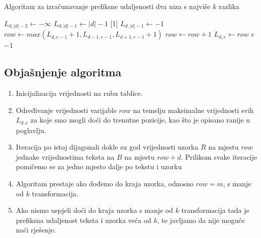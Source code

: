 \documentclass[times, utf8, zavrsni]{fer}
\begin{document}
\begin{algorithm}
\caption{Algoritam za izračunavanje prefiksne udaljenosti dva niza s najviše $k$ razlika}\label{alg:prefix}
\begin{algorithmic}[1]
    \State $L_{d,|d|-2} \gets -\infty$
     \State $L_{d,|d|-1} \gets |d|-1$ [1]
    \Else \State $L_{d,|d|-1} \gets -1$
    \EndIf
\EndFor
\linebreak
{}
        \State
        \State [2] $row\gets max(L_{d,e-1} + 1, L_{d-1,e-1}, L_{d+1,e-1} + 1)$
            \State [3] $row\gets row+1$
        \EndWhile
        \State $L_{d,e}\gets row$
        \State 
            \State[4] \Return $e$
        \EndIf
    \EndFor
\EndFor
\linebreak
\State [5] \Return $-1$
\end{algorithmic}
\end{algorithm}

\subsection{Objašnjenje algoritma}
\begin{enumerate}
\item Inicijalizacija vrijednosti na rubu tablice.
\item Određivanje vrijednosti varijable $row$ na temelju maksimalne vrijednosti svih $L_{d,e}$ za koje smo mogli doći do trenutne pozicije, kao što je opisano ranije u poglavlju.
\item Iteracija po istoj dijagonali dokle su god vrijednosti uzorka $R$ na mjestu $row$ jednake vrijednostima teksta na $B$ na mjestu $row+d$. Prilikom svake iteracije pomičemo se za jedno mjesto dalje po tekstu i uzorku
\item Algoritam prestaje ako dođemo do kraja uzorka, odnosno $row=m$, s manje od $k$ transformacija.
\item Ako nismo uspjeli doći do kraja uzorka s manje od $k$ transformacija tada je prefiksna udaljenost teksta i uzorka veća od $k$, te javljamo da nije moguće naći rješenje.
\end{enumerate}
\end{document}
